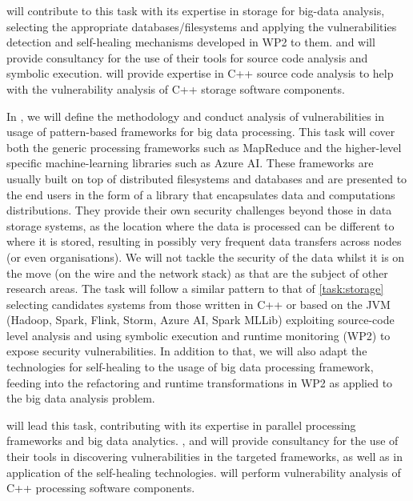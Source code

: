 \begin{Workpackage}{\thewpno}
\begin{Task}
\UODshort{} will contribute to this task with its expertise in storage for big-data analysis, selecting the appropriate databases/filesystems and applying the vulnerabilities detection and self-healing mechanisms developed in WP2 to them. \IBMshort{} and \YAGshort{} will provide consultancy for the use of their tools for source code analysis and symbolic execution. \UCMshort{} will provide expertise in C++ source code analysis to help with the vulnerability analysis of C++ storage software components.
 \end{Task}

 \begin{Task}
 
 \TaskResults{%
 \ref{del:bigdata1}
 \ref{del:bigdata2}
 \ref{del:bigdata3}
 }
 \TaskHeader{}
 In \theTask, we will define the methodology and conduct analysis of vulnerabilities in usage of pattern-based frameworks for big data processing. This task will cover both the generic processing frameworks such as MapReduce and the higher-level specific machine-learning libraries such as Azure AI. These frameworks are usually built on top of distributed filesystems and databases and are presented to the end users in the form of a library that encapsulates data and computations distributions. They provide their own security challenges beyond those in data storage systems, as the location where the data is processed can be different to where it is stored, resulting in possibly very frequent data transfers across nodes (or even organisations). We will not tackle the security of the data whilst it is on the move (on the wire and the network stack) as that are the subject of other research areas.  The task will follow a similar pattern to that of \ref{task:storage} selecting candidates systems from those written in C++ or based on the JVM (Hadoop, Spark, Flink, Storm, Azure AI, Spark MLLib) exploiting source-code level analysis and using symbolic execution and runtime monitoring (WP2) to expose security vulnerabilities. In addition to that, we will also adapt the technologies for self-healing to the usage of big data processing framework, feeding into the refactoring and runtime transformations in WP2 as applied to the big data analysis problem.
 
\UODshort{} will lead this task, contributing with its expertise in parallel processing frameworks and big data analytics. \IBMshort{}, \YAGshort{} and \DEMshort{} will provide consultancy for the use of their tools in discovering vulnerabilities in the targeted frameworks, as well as in application of the self-healing technologies. \UCM will perform vulnerability analysis of C++ processing software components.


\end{Task}
\end{Workpackage}
